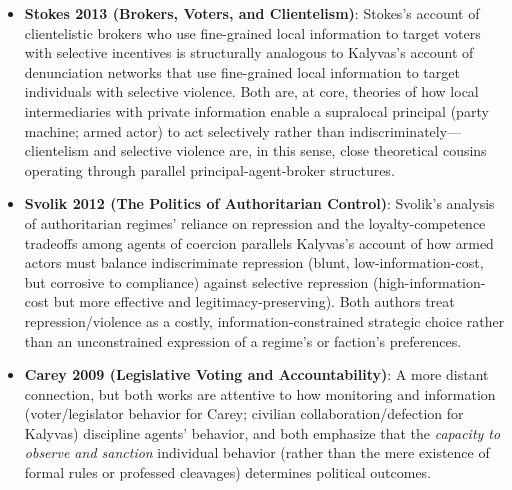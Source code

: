 \documentclass[12pt]{article}
\begin{document}
\begin{itemize}[leftmargin=*, itemsep=4pt]
    \item \textbf{Stokes 2013 (Brokers, Voters, and Clientelism)}: Stokes's account of clientelistic brokers who use fine-grained local information to target voters with selective incentives is structurally analogous to Kalyvas's account of denunciation networks that use fine-grained local information to target individuals with selective violence. Both are, at core, theories of how local intermediaries with private information enable a supralocal principal (party machine; armed actor) to act selectively rather than indiscriminately---clientelism and selective violence are, in this sense, close theoretical cousins operating through parallel principal-agent-broker structures.
    \item \textbf{Svolik 2012 (The Politics of Authoritarian Control)}: Svolik's analysis of authoritarian regimes' reliance on repression and the loyalty-competence tradeoffs among agents of coercion parallels Kalyvas's account of how armed actors must balance indiscriminate repression (blunt, low-information-cost, but corrosive to compliance) against selective repression (high-information-cost but more effective and legitimacy-preserving). Both authors treat repression/violence as a costly, information-constrained strategic choice rather than an unconstrained expression of a regime's or faction's preferences.
    \item \textbf{Carey 2009 (Legislative Voting and Accountability)}: A more distant connection, but both works are attentive to how monitoring and information (voter/legislator behavior for Carey; civilian collaboration/defection for Kalyvas) discipline agents' behavior, and both emphasize that the \emph{capacity to observe and sanction} individual behavior (rather than the mere existence of formal rules or professed cleavages) determines political outcomes.
\end{itemize}
\end{document}
